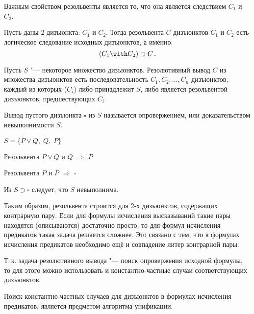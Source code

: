 Важным свойством резольвенты является то, что она является следствием
$C_1$ и $C_2$.

\begin{theorem} Пусть даны 2 дизъюнкта: $C_1$ и $C_2$. Тогда
резольвента $C$ дизъюнктов $C_1$ и $C_2$ есть логическое следование
исходных дизъюнктов, а именно:
  \begin{equation} (C_1 \with C_2) \supset C\,.
  \end{equation}
\end{theorem}

\begin{defin} Пусть $S$ "--- некоторое
множество дизъюнктов. Резолютивный вывод $C$ из множества дизъюнктов
есть последовательность $C_1,C_2,\ldots,C_n$ дизъюнктов, каждый из
которых ($C_i$) либо принадлежит $S$, либо является резольвентой
дизъюнктов, предшествующих $C_i$.

  Вывод пустого дизъюнкта $\square$ из $S$ называется опровержением,
или доказательством невыполнимости $S$.
\end{defin}

\begin{ex} $S = \{\overline{P}\lor{}Q,\; \overline{Q},\; P\}$

  Резольвента $\overline{P}\lor{}Q$ и $\overline{Q}$ $\Rightarrow$
$\overline{P}$

  Резольвента $P$ и $\overline{P}$ $\Rightarrow$ $\square$

  Из $S \supset \square$ следует, что $S$ невыполнима.
\end{ex}

Таким образом, резольвента строится для 2-х дизъюнктов, содержащих
контрарную пару. Если для формулы исчисления высказываний такие пары
находятся (описываются) достаточно просто, то для формул исчисления
предикатов такая задача решается сложнее. Это связано с тем, что в
формулах исчисления предикатов необходимо ещё и совпадение литер
контрарной пары.

Т.\,к. задача резолютивного вывода "--- поиск опровержения исходной
формулы, то для этого можно использовать и константно-частные случаи
соответствующих дизъюнктов.

Поиск константно-частных случаев для дизъюнктов в формулах исчисления
предикатов, является предметом алгоритма унификации.


